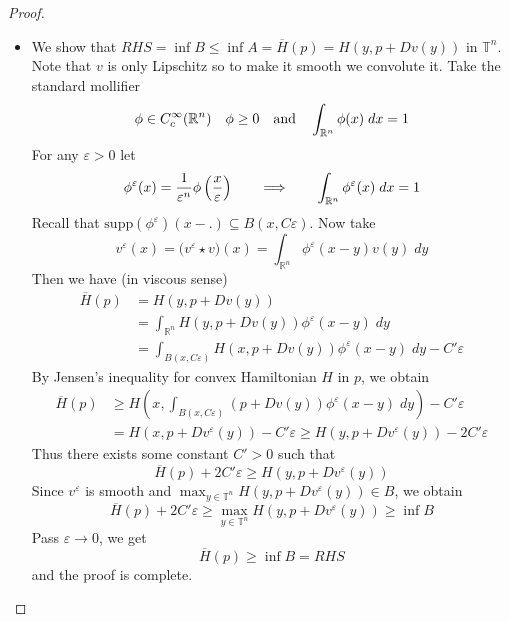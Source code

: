 \documentclass[12pt, oneside]{amsart}  	%
\begin{document}
\begin{proof}
\begin{itemize}
\item We show that $RHS = \inf B\le \inf A= \overline{H}(p)=H(y, p + Dv(y))$ in $\mathbb{T}^n$. Note that $v$ is only Lipschitz so to make it smooth we convolute it. Take the standard mollifier 
\begin{equation*}
\phi\in C^\infty_c(\mathbb{R}^n)\quad \phi \ge 0\quad\text{and}\quad \int_{\mathbb{R}^n} \phi(x)\;dx =1
\end{equation*}
For any $\varepsilon>0$ let
\begin{equation*}
\phi^\varepsilon(x) = \frac{1}{\varepsilon^n}\phi\left(\frac{x}{\varepsilon} \right) \qquad\Longrightarrow\qquad   \int_{\mathbb{R}^n}\phi^\varepsilon(x)\;dx=1
\end{equation*}
Recall that $\text{supp}(\phi^\varepsilon)(x-.) \subseteq B(x,C\varepsilon)$. Now take
\begin{equation*}
v^\varepsilon(x) = \Big(v^\varepsilon \star v\Big)(x) = \int_{\mathbb{R}^n} \phi^\varepsilon(x-y)v(y)\;dy
\end{equation*}
Then we have (in viscous sense)
\begin{align*}
\overline{H}(p) &= H(y,p+Dv(y))\\
           &= \int_{\mathbb{R}^n} H(y,p+Dv(y))\phi^\varepsilon(x-y)\;dy\\
           &= \int_{B(x,C\varepsilon)} H(x,p+Dv(y))\phi^\varepsilon(x-y)\;dy  - C'\varepsilon
\end{align*}
By Jensen's inequality for convex Hamiltonian $H$ in $p$, we obtain
\begin{align*}
\overline{H}(p) &\geq H\left(x, \int_{B(x,C\varepsilon)} (p+Dv(y))\phi^\varepsilon(x-y)\;dy\right) - C'\varepsilon\\
 		   &= H(x,p+Dv^\varepsilon(y)) - C'\varepsilon \geq H(y,p+Dv^\varepsilon(y)) - 2C'\varepsilon
\end{align*}
Thus there exists some constant $C'>0$ such that 
\begin{equation*}
\overline{H}(p) + 2C'\varepsilon \geq H(y,p+Dv^\varepsilon(y))
\end{equation*}
Since $v^\varepsilon$ is smooth and $\max_{y\in \mathbb{T}^n} H(y,p+Dv^\varepsilon(y))\in B$, we obtain
\begin{equation*}
\overline{H}(p) + 2C'\varepsilon \geq \max_{y\in \mathbb{T}^n} H(y,p+Dv^\varepsilon(y))\geq \inf B
\end{equation*}
Pass $\varepsilon \longrightarrow 0$, we get
\begin{equation*}
\overline{H}(p) \geq \inf B = RHS
\end{equation*}
and the proof is complete.
\end{itemize}
\end{proof}
\end{document}

